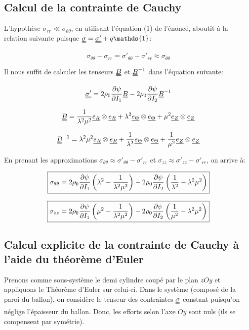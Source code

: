 \documentclass[a4paper,11pt]{article}
\newcommand{\FRAC}{\displaystyle\frac}
\newcommand{\tens}{\uuline}
\newcommand{\diage}[1]{\uline{e_{#1}} \otimes \uline{e_{#1}}}
\begin{document}
\subsection{Calcul de la contrainte de Cauchy}

L'hypothèse $\sigma_{rr} \ll \sigma_{\theta\theta}$, en utilisant l'équation (1) de l'énoncé, aboutit à la relation suivante puisque $\tens{\sigma} = \tens{\sigma'} + q \mathds{1}$:

$$\sigma_{\theta\theta} - \sigma_{rr} = \sigma'_{\theta\theta} - \sigma'_{rr} \approx \sigma_{\theta\theta}$$

Il nous suffit de calculer les tenseurs $\tens{B}$ et $\tens{B}^{-1}$ dans l'équation suivante:

$$ \tens{\sigma'} = 2 \rho_0 \frac{\partial\psi}{\partial I_1} \tens {B} - 2 \rho_0 \frac{\partial\psi}{\partial I_2} \tens {B}^{-1}$$

$$ \tens{B} = \frac{1}{\lambda^2\mu^2} \diage{R} + \lambda^2 \diage{\Theta} + \mu^2 \diage{Z} $$

$$ \tens{B}^{-1} = \lambda^2\mu^2 \diage{R} + \frac{1}{\lambda^2} \diage{\Theta} + \frac{1}{\mu^2} \diage{Z} $$

En prenant les approximations $\sigma_{\theta\theta} \approx \sigma'_{\theta\theta} - \sigma'_{rr}$ et $\sigma_{zz} \approx \sigma'_{zz} - \sigma'_{rr}$, on arrive à:

$$\fbox{$\sigma_{\theta\theta} = 2 \rho_0 \FRAC{\partial\psi}{\partial I_1} \left( \lambda^2 - \FRAC{1}{\lambda^2\mu^2} \right) - 2 \rho_0 \FRAC{\partial\psi}{\partial I_2} \left( \FRAC{1}{\lambda^2} - \lambda^2\mu^2 \right)$}$$

$$\fbox{$\sigma_{zz} = 2 \rho_0 \FRAC{\partial\psi}{\partial I_1} \left( \mu^2 - \FRAC{1}{\lambda^2\mu^2} \right) - 2 \rho_0 \FRAC{\partial\psi}{\partial I_2} \left( \FRAC{1}{\mu^2} - \lambda^2\mu^2 \right)$}$$

\subsection{Calcul explicite de la contrainte de Cauchy à l'aide du théorème d'Euler}

Prenons comme sous-système le demi cylindre coupé par le plan $zOy$ et appliquons le Théorème d'Euler sur celui-ci. Dans le système (composé de la paroi du ballon), on considère le tenseur des contraintes $\tens{\sigma}$ constant puisqu'on néglige l'épaisseur du ballon. Donc, les efforts selon l'axe $Oy$ sont nuls (ils se compensent par symétrie).
\end{document}

